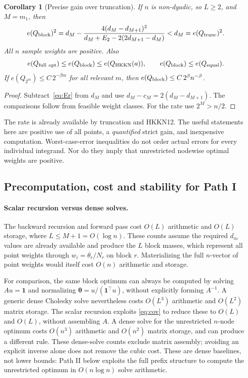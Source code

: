 \documentclass[11pt]{article}
\newtheorem{corollary}[proposition]{Corollary}
\newcommand{\bbone}{\boldsymbol{1}}
\newcommand{\btheta}{\boldsymbol{\theta}}
\begin{document}
\begin{corollary}[Precise gain over truncation]\label{cor:gain}
If $n$ is non-dyadic, so $L\ge2$, and $M=m_1$, then
\begin{equation}\label{eq:gain}
 e(Q_{\rm block})^2
 =d_M-\frac{4(d_M-d_{M+1})^2}
 {d_M+E_2-2(2d_{M+1}-d_M)}
 <d_M=e(Q_{\rm trunc})^2.
\end{equation}
All $n$ sample weights are positive. Also
\[
 e(Q_{\rm full\ opt})\le e(Q_{\rm block})
 \le e(Q_{\rm HKKN}(a)),\qquad
 e(Q_{\rm block})\le e(Q_{\rm equal}).
\]
If $e(Q_{2^m})\le C\,2^{-\beta m}$ for all relevant $m$, then
$e(Q_{\rm block})\le C\,2^\beta n^{-\beta}$.
\end{corollary}
\begin{proof}
Subtract~\eqref{eq:Er} from $d_M$ and use
$d_M-c_M=2(d_M-d_{M+1})$.
The comparisons follow from feasible weight classes.
For the rate use $2^M>n/2$.
\end{proof}
The rate is already available by truncation and HKKN12.
The useful statements here are positive use of all points, a
\emph{quantified} strict gain, and inexpensive computation.
Worst-case-error inequalities do not order actual errors for every
individual integrand. Nor do they imply that unrestricted nodewise
optimal weights are positive.

\subsection{Precomputation, cost and stability for Path I}\label{sec:blockcost}
\paragraph{Scalar recursion versus dense solves.}
The backward recursion and forward pass cost $O(L)$ arithmetic and
$O(L)$ storage, where $L\le M+1=O(\log n)$.
These counts assume the required $d_m$ values are already available
and produce the $L$ block masses, which represent all point weights
through $w_i=\theta_r/N_r$ on block $r$.
Materializing the full $n$-vector of point weights would itself cost $O(n)$
arithmetic and storage.

For comparison, the same block optimum can always be computed by
solving $Au=\bbone$ and normalizing
$\btheta=u/(\bbone^\top u)$, without explicitly forming $A^{-1}$.
A generic dense Cholesky solve nevertheless costs $O(L^3)$ arithmetic
and $O(L^2)$ matrix storage. The scalar recursion exploits
\eqref{eq:cov} to reduce these to $O(L)$ and $O(L)$, without assembling
$A$. A dense solve for the unrestricted $n$-node optimum costs
$O(n^3)$ arithmetic and $O(n^2)$ matrix storage, and can produce a
different rule. These dense-solve counts exclude matrix assembly;
avoiding an explicit inverse alone does not remove the cubic cost.
These are dense baselines, not lower bounds: Path II below exploits
the full prefix structure to compute the unrestricted optimum in
$O(n\log n)$ solve arithmetic.
\end{document}
